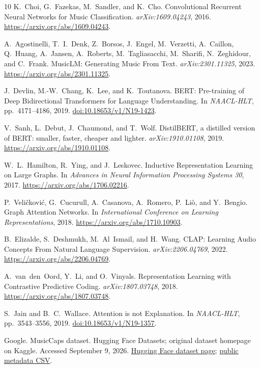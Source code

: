 \documentclass[10pt,twocolumn,letterpaper]{article}
\begin{document}
\FloatBarrier
\begin{thebibliography}{10}
\small
{}
K.~Choi, G.~Fazekas, M.~Sandler, and K.~Cho.
\newblock Convolutional Recurrent Neural Networks for Music Classification.
\newblock \emph{arXiv:1609.04243}, 2016.
\newblock \url{https://arxiv.org/abs/1609.04243}.

A.~Agostinelli, T.~I.~Denk, Z.~Borsos, J.~Engel, M.~Verzetti, A.~Caillon, Q.~Huang,
A.~Jansen, A.~Roberts, M.~Tagliasacchi, M.~Sharifi, N.~Zeghidour, and C.~Frank.
\newblock MusicLM: Generating Music From Text.
\newblock \emph{arXiv:2301.11325}, 2023.
\newblock \url{https://arxiv.org/abs/2301.11325}.

J.~Devlin, M.-W.~Chang, K.~Lee, and K.~Toutanova.
\newblock BERT: Pre-training of Deep Bidirectional Transformers for Language Understanding.
\newblock In \emph{NAACL-HLT}, pp.~4171--4186, 2019.
\newblock \href{https://aclanthology.org/N19-1423/}{doi:10.18653/v1/N19-1423}.

V.~Sanh, L.~Debut, J.~Chaumond, and T.~Wolf.
\newblock DistilBERT, a distilled version of BERT: smaller, faster, cheaper and lighter.
\newblock \emph{arXiv:1910.01108}, 2019.
\newblock \url{https://arxiv.org/abs/1910.01108}.

W.~L.~Hamilton, R.~Ying, and J.~Leskovec.
\newblock Inductive Representation Learning on Large Graphs.
\newblock In \emph{Advances in Neural Information Processing Systems 30}, 2017.
\newblock \url{https://arxiv.org/abs/1706.02216}.

P.~Veli\v{c}kovi\'c, G.~Cucurull, A.~Casanova, A.~Romero, P.~Li\`o, and Y.~Bengio.
\newblock Graph Attention Networks.
\newblock In \emph{International Conference on Learning Representations}, 2018.
\newblock \url{https://arxiv.org/abs/1710.10903}.

B.~Elizalde, S.~Deshmukh, M.~Al~Ismail, and H.~Wang.
\newblock CLAP: Learning Audio Concepts From Natural Language Supervision.
\newblock \emph{arXiv:2206.04769}, 2022.
\newblock \url{https://arxiv.org/abs/2206.04769}.

A.~van~den~Oord, Y.~Li, and O.~Vinyals.
\newblock Representation Learning with Contrastive Predictive Coding.
\newblock \emph{arXiv:1807.03748}, 2018.
\newblock \url{https://arxiv.org/abs/1807.03748}.

S.~Jain and B.~C.~Wallace.
\newblock Attention is not Explanation.
\newblock In \emph{NAACL-HLT}, pp.~3543--3556, 2019.
\newblock \href{https://aclanthology.org/N19-1357/}{doi:10.18653/v1/N19-1357}.

Google.
\newblock MusicCaps dataset.
\newblock Hugging Face Datasets; original dataset homepage on Kaggle. Accessed September 9, 2026.
\newblock \href{https://huggingface.co/datasets/google/MusicCaps}{Hugging Face dataset page};
\href{https://huggingface.co/datasets/google/MusicCaps/blob/main/musiccaps-public.csv}{public metadata CSV}.
\end{thebibliography}
\end{document}
